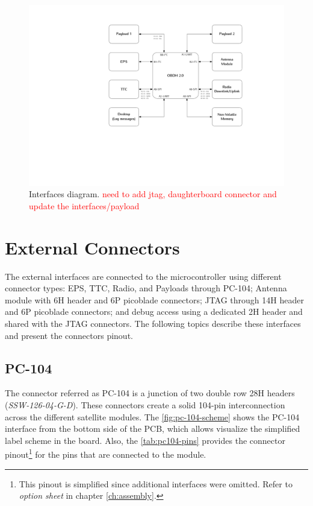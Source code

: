 \begin{figure}[!ht]
    \begin{center}
        \includegraphics[width=\textwidth]{figures/diagram_interfaces.pdf}
        \caption{Interfaces diagram. \textcolor{red}{need to add jtag, daughterboard connector and update the interfaces/payload}}
        \label{fig:diagram-interfaces}
    \end{center}
\end{figure}

\section{External Connectors}

The external interfaces are connected to the microcontroller using different connector types: EPS, TTC, Radio, and Payloads through PC-104; Antenna module with 6H header and 6P picoblade connectors; JTAG through 14H header and 6P picoblade connectors; and debug access using a dedicated 2H header and shared with the JTAG connectors. The following topics describe these interfaces and present the connectors pinout.

\subsection{PC-104}

The connector referred as PC-104 is a junction of two double row 28H headers (\textit{SSW-126-04-G-D}). These connectors create a solid 104-pin interconnection across the different satellite modules. The \autoref{fig:pc-104-scheme} shows the PC-104 interface from the bottom side of the PCB, which allows visualize the simplified label scheme in the board. Also, the \autoref{tab:pc104-pins} provides the connector pinout\footnote{This pinout is simplified since additional interfaces were omitted. Refer to \textit{option sheet} in chapter \ref{ch:assembly}.} for the pins that are connected to the module. 

